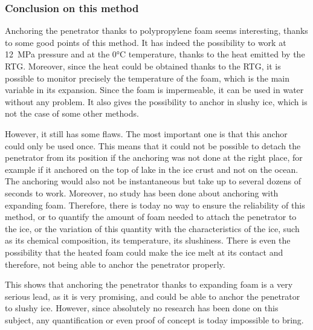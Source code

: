 \subsubsection{Conclusion on this method}

Anchoring the penetrator thanks to polypropylene foam seems interesting, thanks to some good points of this method. It has indeed the possibility to work at 12~MPa pressure and at the 0°C temperature, thanks to the heat emitted by the RTG. Moreover, since the heat could be obtained thanks to the RTG, it is possible to monitor precisely the temperature of the foam, which is the main variable in its expansion. Since the foam is impermeable, it can be used in water without any problem. It also gives the possibility to anchor in slushy ice, which is not the case of some other methods.

However, it still has some flaws. The most important one is that this anchor could only be used once. This means that it could not be possible to detach the penetrator from its position if the anchoring was not done at the right place, for example if it anchored on the top of lake in the ice crust and not on the ocean. The anchoring would also not be instantaneous but take up to several dozens of seconds to work.
Moreover, no study has been done about anchoring with expanding foam. Therefore, there is today no way to ensure the reliability of this method, or to quantify the amount of foam needed to attach the penetrator to the ice, or the variation of this quantity with the characteristics of the ice, such as its chemical composition, its temperature, its slushiness. There is even the possibility that the heated foam could make the ice melt at its contact and therefore, not being able to anchor the penetrator properly.

This shows that anchoring the penetrator thanks to expanding foam is a very serious lead, as it is very promising, and could be able to anchor the penetrator to slushy ice. However, since absolutely no research has been done on this subject, any quantification or even proof of concept is today impossible to bring.
